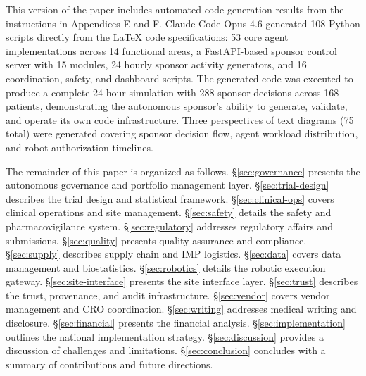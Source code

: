 This version of the paper includes automated code generation results from the
instructions in Appendices E and F. Claude Code Opus 4.6 generated 108 Python scripts
directly from the LaTeX code specifications: 53 core agent implementations across
14 functional areas, a FastAPI-based sponsor control server with 15 modules, 24 hourly
sponsor activity generators, and 16 coordination, safety, and dashboard scripts. The
generated code was executed to produce a complete 24-hour simulation with 288 sponsor
decisions across 168 patients, demonstrating the autonomous sponsor's ability to generate,
validate, and operate its own code infrastructure. Three perspectives of text diagrams
(75 total) were generated covering sponsor decision flow, agent workload distribution, and
robot authorization timelines.

The remainder of this paper is organized as follows. \S\ref{sec:governance} presents the
autonomous governance and portfolio management layer. \S\ref{sec:trial-design} describes the
trial design and statistical framework. \S\ref{sec:clinical-ops} covers clinical operations
and site management. \S\ref{sec:safety} details the safety and pharmacovigilance system.
\S\ref{sec:regulatory} addresses regulatory affairs and submissions. \S\ref{sec:quality}
presents quality assurance and compliance. \S\ref{sec:supply} describes supply chain and IMP
logistics. \S\ref{sec:data} covers data management and biostatistics.
\S\ref{sec:robotics} details the robotic execution gateway. \S\ref{sec:site-interface}
presents the site interface layer. \S\ref{sec:trust} describes the trust, provenance, and
audit infrastructure. \S\ref{sec:vendor} covers vendor management and CRO coordination.
\S\ref{sec:writing} addresses medical writing and disclosure. \S\ref{sec:financial} presents
the financial analysis. \S\ref{sec:implementation} outlines the national implementation
strategy. \S\ref{sec:discussion} provides a discussion of challenges and limitations.
\S\ref{sec:conclusion} concludes with a summary of contributions and future directions.
